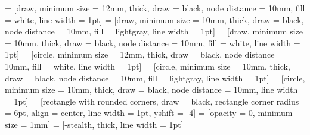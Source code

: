 \documentclass{article}
\begin{document}
\setlength{\parindent}{-4cm}


 = [draw, minimum size = 12mm, thick, draw = black, node distance = 10mm, fill = white, line width = 1pt]
 = [draw, minimum size = 10mm, thick, draw = black, node distance = 10mm, fill = lightgray, line width = 1pt]
 = [draw, minimum size = 10mm, thick, draw = black, node distance = 10mm, fill = white, line width = 1pt]
 = [circle, minimum size = 12mm, thick, draw = black, node distance = 10mm, fill = white, line width = 1pt]
 = [circle, minimum size = 10mm, thick, draw = black, node distance = 10mm, fill = lightgray, line width = 1pt]
 = [circle, minimum size = 10mm, thick, draw = black, node distance = 10mm, line width = 1pt]
 = [rectangle with rounded corners, draw = black, rectangle corner radius = 6pt, align = center, line width = 1pt, yshift = -4]
 = [opacity = 0, minimum size = 1mm]
 = [-stealth, thick, line width = 1pt]

\end{document}
